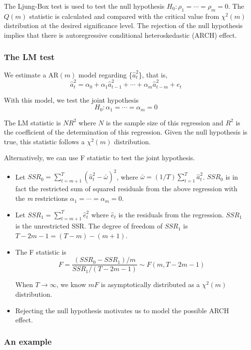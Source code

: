 \documentclass[a4paper,11pt]{article}
\begin{document}
The Ljung-Box test is used to test the null hypothesis
\(H_0: \rho_1 = \cdots = \rho_m = 0\). The \(Q(m)\) statistic is
calculated and compared with the critical value from \(\chi^2(m)\)
distribution at the desired significance level. The rejection of the
null hypothesis implies that there is autoregressive conditional
heteroskedastic (ARCH) effect.

\subsubsection*{The LM test}
\label{sec:org6d4307e}

We estimate a AR\((m)\) model regarding \{\(\hat{a}^2_t\)\}, that is,
\[ \hat{a}^2_t = \alpha_0 + \alpha_1 \hat{a}_{t-1}^2 + \cdots +
\alpha_m \hat{a}^2_{t-m} + e_t \]

With this model, we test the joint hypothesis
\[H_0: \alpha_1 = \cdots = \alpha_m = 0 \]

The LM statistic is \(NR^2\) where \(N\) is the sample size of this
regression and \(R^2\) is the coefficient of the determination of this
regression. Given the null hypothesis is true, this statistic follows
a \(\chi^2(m)\) distribution.

Alternatively, we can use F statistic to test the joint
hypothesis.
\begin{itemize}
\item Let \(SSR_0 = \sum_{t=m+1}^{T} (\hat{a}^2_{t} -
  \bar{\omega})^2\), where \(\bar{\omega} = (1/T) \sum_{t=1}^T
  \hat{a}^2_t\). \(SSR_0\) is in fact the restricted sum of squared
residuals from the above regression with the \emph{m} restrictions
\(\alpha_1 = \cdots = \alpha_m = 0\).
\item Let \(SSR_1 = \sum_{t=m+1}^T \hat{e}^2_t\) where \(\hat{e}_t\) is the
residuals from the regression. \(SSR_1\) is the unrestricted SSR. The
degree of freedom of \(SSR_1\) is \(T-2m-1 = (T-m) - (m+1)\).
\item The F statistic is
\[F = \frac{(SSR_0 - SSR_1)/m}{SSR_1/(T-2m-1)} \sim F(m, T-2m-1)\]

When \(T \rightarrow \infty\), we know \(mF\) is asymptotically
distributed as a \(\chi^2(m)\) distribution.

\item Rejecting the null hypothesis motivates us to model the possible
ARCH effect.
\end{itemize}

\subsubsection*{An example}
\label{sec:orgd134f8a}
\end{document}
